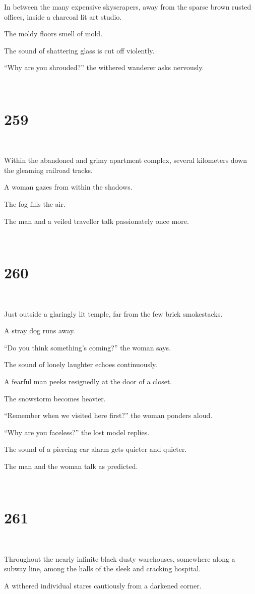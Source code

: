 \documentclass{report}
\begin{document}
In between the many expensive skyscrapers, away from the sparse brown rusted offices, inside a charcoal lit art studio.

The moldy floors smell of mold.

The sound of shattering glass is cut off violently.

``Why are you shrouded?'' the withered wanderer asks nervously.

~
\chapter*{259}
~

Within the abandoned and grimy apartment complex, several kilometers down the gleaming railroad tracks.

A woman gazes from within the shadows.

The fog fills the air.

The man and a veiled traveller talk passionately once more.

~
\chapter*{260}
~

Just outside a glaringly lit temple, far from the few brick smokestacks.

A stray dog runs away.

``Do you think something's coming?'' the woman says.

The sound of lonely laughter echoes continuously.

A fearful man peeks resignedly at the door of a closet.

The snowstorm becomes heavier.

``Remember when we visited here first?'' the woman ponders aloud.

``Why are you faceless?'' the lost model replies.

The sound of a piercing car alarm gets quieter and quieter.

The man and the woman talk as predicted.

~
\chapter*{261}
~

Throughout the nearly infinite black dusty warehouses, somewhere along a subway line, among the halls of the sleek and cracking hospital.

A withered individual stares cautiously from a darkened corner.
\end{document}
